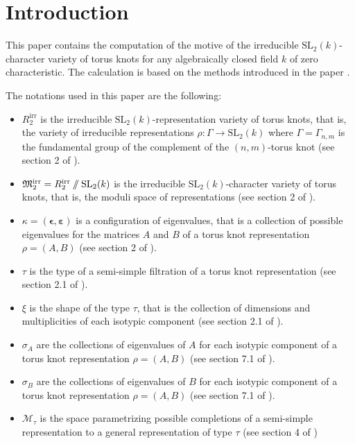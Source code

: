 \documentclass[10pt,a4paper]{amsart}
\begin{document}
\section*{Introduction}

\vspace{-0.05cm}

This paper contains the computation of the motive of the irreducible $\mathrm{SL}_{2}(k)$-character variety of torus knots for any algebraically closed field $k$ of zero characteristic. The calculation is based on the methods introduced in the paper \cite{GPM}. 

The notations used in this paper are the following:
\begin{itemize}
	\item $R_{2}^{\textrm{irr}}$ is the irreducible $\mathrm{SL}_{2}(k)$-representation variety of torus knots, that is, the variety of irreducible representations $\rho: \Gamma \to \mathrm{SL}_{2}(k)$ where $\Gamma = \Gamma_{n,m}$ is the fundamental group of the complement of the $(n,m)$-torus knot (see section {2} of \cite{GPM}).
	\item ${\frak M}_{2}^{\textrm{irr}} = R_{2}^{\textrm{irr}} \sslash \mathrm{SL}_{2}(k)$ is the irreducible $\mathrm{SL}_{2}(k)$-character variety of torus knots, that is, the moduli space of representations (see section {2} of \cite{GPM}).
	\item $\kappa = (\bm{\epsilon}, \bm{\varepsilon})$ is a configuration of eigenvalues, that is a collection of possible eigenvalues for the matrices $A$ and $B$ of a torus knot representation $\rho = (A,B)$ (see section {2} of \cite{GPM}).
	\item $\tau$ is the type of a semi-simple filtration of a torus knot representation (see section 2.1 of \cite{GPM}).
	\item $\xi$ is the shape of the type $\tau$, that is the collection of dimensions and multiplicities of each isotypic component (see section 2.1 of \cite{GPM}).
	\item $\sigma_A$ are the collections of eigenvalues of $A$ for each isotypic component of a torus knot representation $\rho = (A,B)$ (see section 7.1 of \cite{GPM}).
	\item $\sigma_B$ are the collections of eigenvalues of $B$ for each isotypic component of a torus knot representation $\rho = (A,B)$ (see section 7.1 of \cite{GPM}).
	\item $\mathcal{M}_{\tau}$ is the space parametrizing possible completions of a semi-simple representation to a general representation of type $\tau$ (see section 4 of \cite{GPM})

\end{itemize}
\end{document}
